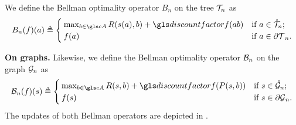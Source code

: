 \begin{definition}
	\begin{leftbar}[defnbar]
	\label{def:bellman}
	\leavevmode\newline
	 We define the Bellman optimality operator $B_n$ on the tree $\mathcal{T}_n$ as
	\begin{equation}
	\label{eq:bellman-tree}
	B_n(f)(a) \eqdef \begin{cases}
	\max_{b\in \cA} R(s(a), b) + \discount f({ab})
	& \text{if $a\in\inte{\Tau}_n$;} \\
	f(a) & \text{if $a\in\ext{\Tau}_n$.}
	\end{cases}
	\end{equation}
	
	{\textbf{On graphs.}} Likewise, we define the Bellman optimality operator $\mathcal{B}_n$ on the graph $\mathcal{G}_n$ as
	\begin{equation}
	\label{eq:bellman-graph}
	\cB_n(f)(s) \eqdef \begin{cases}
	\max_{b\in \cA} R(s, b) + \discount f(P(s,b))
	& \text{if $s\in\inte{\cG}_n$;} \\
	f(s) & \text{if $s\in\ext{\cG}_n$.}
	\end{cases}
	\end{equation}
	The updates of both Bellman operators are depicted in .
	\end{leftbar}
\end{definition}



